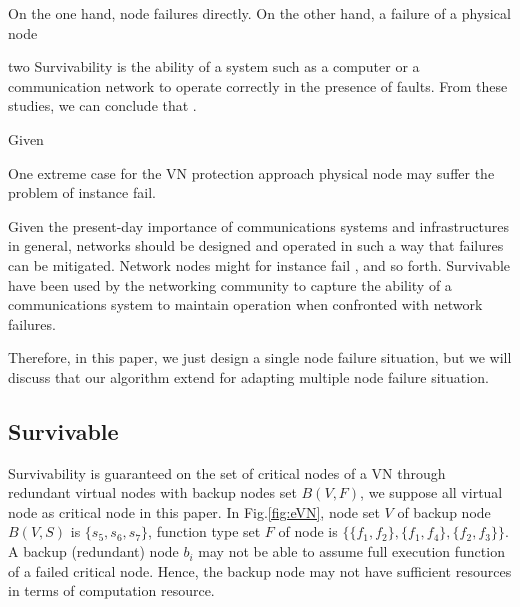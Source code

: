 On the one hand, node failures  directly. On the other hand, a failure of a physical node

 two
 Survivability is the ability of a system such as a computer or a communication network to operate correctly in the presence of faults. From these studies, we can conclude that .




Given

 One extreme case for the VN protection approach
physical node may suffer the problem of instance fail.


Given the present-day importance of communications systems and infrastructures in general, networks should be designed and operated in such a way that failures can be mitigated. Network nodes  might for instance fail , and so forth. Survivable have been used by the networking community to capture the ability of a communications system to maintain operation when confronted
with network failures.

Therefore, in this paper, we just design a single node failure situation, but we will discuss that our algorithm extend for adapting multiple node failure situation.


\subsection{Survivable}

Survivability is guaranteed on the set of critical nodes of a VN through redundant virtual nodes with backup nodes set $B(V,F)$, we suppose all virtual node as critical node in this paper. In Fig.\ref{fig:eVN}, node set $V$ of backup node $B(V,S)$ is $\{s_5,s_6,s_7\}$, function type set $F$ of node is $\{\{f_1,f_2\},\{f_1,f_4\},\{f_2,f_3\}\}$. A backup (redundant) node $b_i$ may not be able to assume full execution function of a failed critical node. Hence, the backup node may not have sufficient resources in terms of computation resource.




